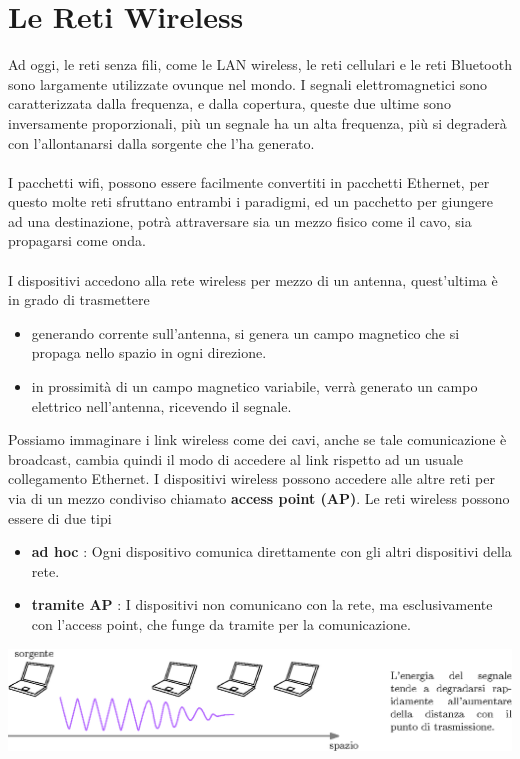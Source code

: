 \documentclass[12pt, letterpaper]{article}
\newcommand{\acc}{\\\hphantom{}\\}
\begin{document}
\section{Le Reti Wireless}
Ad oggi, le reti senza fili, come le LAN wireless, le reti cellulari e le reti Bluetooth sono largamente 
utilizzate ovunque nel mondo. I segnali elettromagnetici sono caratterizzata dalla frequenza, e dalla copertura, 
queste due ultime sono inversamente proporzionali, più un segnale ha un alta frequenza, più si degraderà con 
l'allontanarsi dalla sorgente che l'ha generato. \acc 
I pacchetti wifi, possono essere facilmente convertiti in pacchetti Ethernet, per questo molte reti sfruttano entrambi i 
paradigmi, ed un pacchetto per giungere ad una destinazione, potrà attraversare sia un mezzo fisico come il cavo, sia 
propagarsi come onda.\acc 
I dispositivi accedono alla rete wireless per mezzo di un antenna, quest'ultima è in grado di trasmettere\begin{itemize}
    \item generando corrente sull'antenna, si genera un campo magnetico che si propaga nello spazio in ogni 
    direzione. 
    \item in prossimità di un campo magnetico variabile, verrà generato un campo elettrico nell'antenna, ricevendo il segnale.
\end{itemize}
Possiamo immaginare i link wireless come dei cavi, anche se tale comunicazione è broadcast, cambia quindi il modo di 
accedere al link rispetto ad un usuale collegamento Ethernet. I dispositivi wireless possono accedere alle altre reti 
per via di un mezzo condiviso chiamato \textbf{access point (AP)}. Le reti wireless possono essere di due tipi\begin{itemize}
    \item \textbf{ad hoc} : Ogni dispositivo comunica direttamente con gli altri dispositivi della rete. 
    \item \textbf{tramite AP} : I dispositivi non comunicano con la rete, ma esclusivamente con l'access point, 
    che funge da tramite per la comunicazione.
\end{itemize}\begin{center}
    \includegraphics[width=1\textwidth ]{images/degradazioneSegnale.eps}
\end{center}
\end{document}
